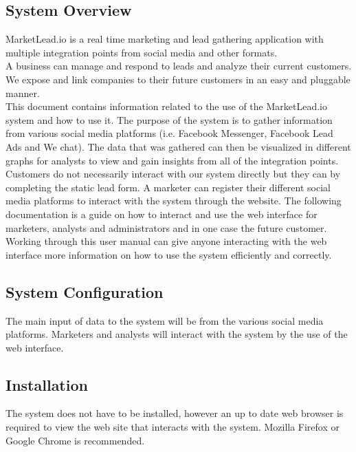 \documentclass{article}
\begin{document}
		\subsection{System Overview}
			MarketLead.io is a real time marketing and lead gathering application with multiple integration points from social media and other formats.\\
			A business can manage and respond to leads and analyze their current customers. We expose and link companies to their future customers in an easy and pluggable manner.\\
			This document contains information related to the use of the MarketLead.io system and how to use it. The purpose of the system is to gather information from various social media platforms (i.e. Facebook Messenger, Facebook Lead Ads and We chat).
			The data that was gathered can then be visualized in different graphs for analysts to view and gain insights from all of the integration points. Customers do not necessarily interact with our system directly but they can by completing the static lead form.  %
			A marketer can register their different social media platforms to interact with the system through the website.
			The following documentation is a guide on how to interact and use the web interface for marketers, analysts and administrators and in one case the future customer.
			Working through this user manual can give anyone interacting with the web interface more information on how to use the system efficiently and correctly.

		\subsection{System Configuration}
			The main input of data to the system will be from the various social media platforms.
			Marketers and analysts will interact with the system by the use of the web interface.

		\subsection{Installation}
			The system does not have to be installed, however an up to date web browser is required to view the web site that interacts with the system. Mozilla Firefox or Google Chrome is recommended.
\end{document}
